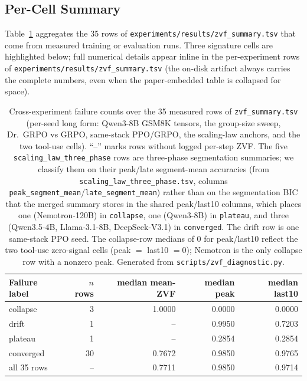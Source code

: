 \subsection{Per-Cell Summary}

Table~\ref{tab:zvf-failure-counts} aggregates the 35 rows of
\texttt{experiments/results/zvf\_summary.tsv} that come from measured training or
evaluation runs. Three
signature cells are highlighted below; full numerical details appear
inline in the per-experiment rows of
\texttt{experiments/results/zvf\_summary.tsv} (the on-disk
artifact always carries the complete numbers, even when the
paper-embedded table is collapsed for space).

\begin{table}[ht]
\centering
\small
\begin{tabular}{lrrrr}
\toprule
Failure label & $n$ rows & median mean-ZVF & median peak & median last10 \\
\midrule
collapse  &  3 & 1.0000 & 0.0000 & 0.0000 \\
drift     &  1 & --     & 0.9950 & 0.7203 \\
plateau   &  1 & --     & 0.2854 & 0.2854 \\
converged & 30 & 0.7672 & 0.9850 & 0.9765 \\
\midrule
all 35 rows & -- & 0.7711 & 0.9850 & 0.9714 \\
\bottomrule
\end{tabular}
\caption{Cross-experiment failure counts over the 35 measured rows of
\texttt{zvf\_summary.tsv} (per-seed long form: Qwen3-8B GSM8K tensors, the
group-size sweep, Dr.~GRPO vs GRPO, same-stack PPO/GRPO, the scaling-law anchors,
and the two tool-use cells). ``--'' marks rows without logged per-step ZVF.
The five \texttt{scaling\_law\_three\_phase} rows are three-phase
segmentation summaries; we classify them on their peak/late
segment-mean accuracies (from
\texttt{scaling\_law\_three\_phase.tsv}, columns
\texttt{peak\_segment\_mean}/\texttt{late\_segment\_mean}) rather than
on the segmentation BIC that the merged summary stores in the shared
peak/last10 columns, which places one (Nemotron-120B) in
\texttt{collapse}, one (Qwen3-8B) in \texttt{plateau}, and three
(Qwen3.5-4B, Llama-3.1-8B, DeepSeek-V3.1) in \texttt{converged}. The drift row
is one same-stack PPO seed. The
collapse-row medians of $0$ for peak/last10 reflect the two tool-use
zero-signal cells (peak $=$ last10 $= 0$); Nemotron is the only
collapse row with a nonzero peak. Generated from
\texttt{scripts/zvf\_diagnostic.py}.}
\label{tab:zvf-failure-counts}
\end{table}

